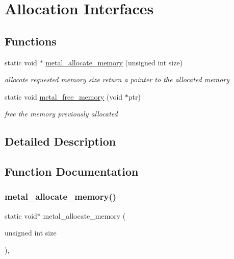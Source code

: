 \hypertarget{group___memory}{}\section{Allocation Interfaces}
\label{group___memory}
\subsection*{Functions}
\begin{DoxyCompactItemize}
\item 
static void $\ast$ \hyperlink{group___memory_gae303083af8eaf1aa05f5455e0f1ccae8}{metal\+\_\+allocate\+\_\+memory} (unsigned int size)
\begin{DoxyCompactList}\small\item\em allocate requested memory size return a pointer to the allocated memory \end{DoxyCompactList}\item 
static void \hyperlink{group___memory_gacfe3e374cb2e273fa55c0b07022bc9db}{metal\+\_\+free\+\_\+memory} (void $\ast$ptr)
\begin{DoxyCompactList}\small\item\em free the memory previously allocated \end{DoxyCompactList}\end{DoxyCompactItemize}


\subsection{Detailed Description}


\subsection{Function Documentation}
\mbox{\label{group___memory_gae303083af8eaf1aa05f5455e0f1ccae8}} 
\subsubsection{\texorpdfstring{metal\+\_\+allocate\+\_\+memory()}{metal\_allocate\_memory()}}
{\footnotesize\ttfamily static void$\ast$ metal\+\_\+allocate\+\_\+memory (\begin{DoxyParamCaption}\item[{unsigned int}]{size }\end{DoxyParamCaption})\hspace{0.3cm}{\ttfamily [inline]}, {\ttfamily [static]}}




